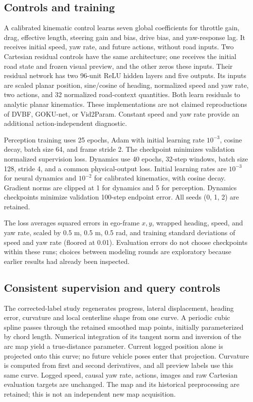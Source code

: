 \documentclass[preprint,12pt]{elsarticle}
\begin{document}
\subsection{Controls and training}\label{sec:baselines}
A calibrated kinematic control learns seven global coefficients for throttle
gain, drag, effective length, steering gain and bias, drive bias, and yaw-response
lag. It receives initial speed, yaw rate, and future actions, without road inputs.
Two Cartesian residual controls have the same architecture; one receives the
initial road state and frozen visual preview, and the other zeros these inputs.
Their residual network has two 96-unit ReLU hidden layers and five outputs.
Its inputs are scaled planar position, sine/cosine of heading, normalized speed
and yaw rate, two actions, and 32 normalized road-context quantities. Both learn
residuals to analytic planar kinematics. These implementations are
not claimed reproductions of DVBF, GOKU-net, or Vid2Param. Constant speed and yaw
rate provide an additional action-independent diagnostic.

Perception training uses 25 epochs, Adam with initial learning rate $10^{-3}$,
cosine decay, batch size 64, and frame stride 2. The checkpoint minimizes
validation normalized supervision loss. Dynamics use 40 epochs, 32-step windows,
batch size 128, stride 4, and a common physical-output loss. Initial learning
rates are $10^{-3}$ for neural dynamics and $10^{-2}$ for calibrated kinematics,
with cosine decay. Gradient norms are clipped at 1 for dynamics and 5 for
perception. Dynamics checkpoints minimize validation 100-step endpoint error.
All seeds (0, 1, 2) are retained.

The loss averages squared errors in ego-frame $x,y$, wrapped heading, speed,
and yaw rate, scaled by 0.5 m, 0.5 m, 0.5 rad, and training standard deviations
of speed and yaw rate (floored at 0.01). Evaluation errors do not choose
checkpoints within these runs; choices between modeling rounds are exploratory
because earlier results had already been inspected.

\subsection{Consistent supervision and query controls}\label{sec:corrected_method}
The corrected-label study regenerates progress, lateral displacement, heading
error, curvature and local centerline shape from one curve. A periodic cubic
spline passes through the retained smoothed map points, initially parameterized
by chord length. Numerical integration of its tangent norm and inversion of the
arc map yield a true-distance parameter. Current logged position alone is
projected onto this curve; no future vehicle poses enter that projection.
Curvature is computed from first and second derivatives, and all preview labels
use this same curve. Logged speed, causal yaw rate, actions, images and raw
Cartesian evaluation targets are unchanged. The map and its historical
preprocessing are retained; this is not an independent new map acquisition.
\end{document}
